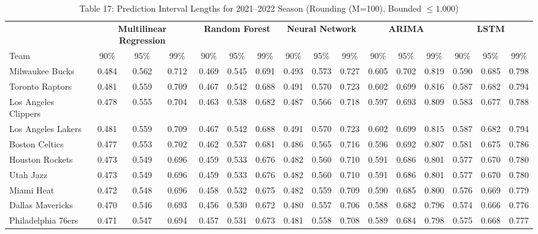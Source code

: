 \documentclass[11pt,a4paper]{article}
\begin{document}
\begin{table}[H]
\centering
\caption{Table 17: Prediction Interval Lengths for 2021--2022 Season (Rounding (M=100), Bounded $\le 1.000$)}
\label{tab:team_table17}
\tiny
\setlength{\tabcolsep}{1.5pt}
\begin{tabular}{l ccc ccc ccc ccc ccc}
\toprule
 & \multicolumn{3}{c}{\textbf{Multilinear Regression}} & \multicolumn{3}{c}{\textbf{Random Forest}} & \multicolumn{3}{c}{\textbf{Neural Network}} & \multicolumn{3}{c}{\textbf{ARIMA}} & \multicolumn{3}{c}{\textbf{LSTM}} \\
\cmidrule(lr){2-4} \cmidrule(lr){5-7} \cmidrule(lr){8-10} \cmidrule(lr){11-13} \cmidrule(lr){14-16}
Team & 90\% & 95\% & 99\% & 90\% & 95\% & 99\% & 90\% & 95\% & 99\% & 90\% & 95\% & 99\% & 90\% & 95\% & 99\% \\
\midrule
Milwaukee Bucks & 0.484 & 0.562 & 0.712 & 0.469 & 0.545 & 0.691 & 0.493 & 0.573 & 0.727 & 0.605 & 0.702 & 0.819 & 0.590 & 0.685 & 0.798 \\
Toronto Raptors & 0.481 & 0.559 & 0.709 & 0.467 & 0.542 & 0.688 & 0.491 & 0.570 & 0.723 & 0.602 & 0.699 & 0.816 & 0.587 & 0.682 & 0.794 \\
Los Angeles Clippers & 0.478 & 0.555 & 0.704 & 0.463 & 0.538 & 0.682 & 0.487 & 0.566 & 0.718 & 0.597 & 0.693 & 0.809 & 0.583 & 0.677 & 0.788 \\
Los Angeles Lakers & 0.481 & 0.559 & 0.709 & 0.467 & 0.542 & 0.688 & 0.491 & 0.570 & 0.723 & 0.602 & 0.699 & 0.815 & 0.587 & 0.682 & 0.794 \\
Boston Celtics & 0.477 & 0.553 & 0.702 & 0.462 & 0.537 & 0.681 & 0.486 & 0.565 & 0.716 & 0.596 & 0.692 & 0.807 & 0.581 & 0.675 & 0.786 \\
Houston Rockets & 0.473 & 0.549 & 0.696 & 0.459 & 0.533 & 0.676 & 0.482 & 0.560 & 0.710 & 0.591 & 0.686 & 0.801 & 0.577 & 0.670 & 0.780 \\
Utah Jazz & 0.473 & 0.549 & 0.696 & 0.459 & 0.533 & 0.676 & 0.482 & 0.560 & 0.710 & 0.591 & 0.686 & 0.801 & 0.577 & 0.670 & 0.780 \\
Miami Heat & 0.472 & 0.548 & 0.696 & 0.458 & 0.532 & 0.675 & 0.482 & 0.559 & 0.709 & 0.590 & 0.685 & 0.800 & 0.576 & 0.669 & 0.779 \\
Dallas Mavericks & 0.470 & 0.546 & 0.693 & 0.456 & 0.530 & 0.672 & 0.480 & 0.557 & 0.706 & 0.588 & 0.682 & 0.796 & 0.574 & 0.666 & 0.776 \\
Philadelphia 76ers & 0.471 & 0.547 & 0.694 & 0.457 & 0.531 & 0.673 & 0.481 & 0.558 & 0.708 & 0.589 & 0.684 & 0.798 & 0.575 & 0.668 & 0.777 \\

\end{tabular}
\end{table}
\end{document}

